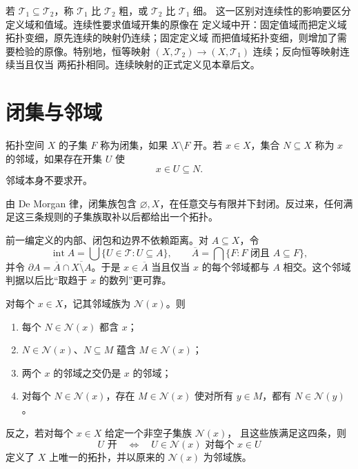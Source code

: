 若 \(\mathcal T_1\subseteq\mathcal T_2\)，称 \(\mathcal T_1\) 比 \(\mathcal T_2\) 粗，或 \(\mathcal T_2\) 比 \(\mathcal T_1\) 细。
这一区别对连续性的影响要区分定义域和值域。连续性要求值域开集的原像在
定义域中开：固定值域而把定义域拓扑变细，原先连续的映射仍连续；固定定义域
而把值域拓扑变细，则增加了需要检验的原像。特别地，恒等映射
\((X,\mathcal T_2)\to(X,\mathcal T_1)\) 连续；反向恒等映射连续当且仅当
两拓扑相同。连续映射的正式定义见本章后文。

\section{闭集与邻域}

\begin{definition}[闭集与邻域]
拓扑空间 \(X\) 的子集 \(F\) 称为闭集，如果 \(X\setminus F\) 开。若 \(x\in X\)，集合 \(N\subseteq X\) 称为 \(x\) 的邻域，如果存在开集 \(U\) 使
\[
 x\in U\subseteq N.
\]
邻域本身不要求开。
\end{definition}

由 De Morgan 律，闭集族包含 \(\varnothing,X\)，在任意交与有限并下封闭。反过来，任何满足这三条规则的子集族取补以后都给出一个拓扑。

前一编定义的内部、闭包和边界不依赖距离。对 \(A\subseteq X\)，令
\[
 \operatorname{int}A=\bigcup\{U\in\mathcal T:U\subseteq A\},
 \qquad
 \overline A=\bigcap\{F:F\text{ 闭且 }A\subseteq F\},
\]
并令 \(\partial A=\overline A\cap\overline{X\setminus A}\)。于是 \(x\in\overline A\) 当且仅当 \(x\) 的每个邻域都与 \(A\) 相交。这个邻域判据以后比“取趋于 \(x\) 的数列”更可靠。

\begin{proposition}[邻域系统刻画]
\label{prop:neighborhood-system-topology}
对每个 \(x\in X\)，记其邻域族为 \(\mathcal N(x)\)。则
\begin{enumerate}[label=\textup{(\roman*)}]
 \item 每个 \(N\in\mathcal N(x)\) 都含 \(x\)；
 \item \(N\in\mathcal N(x)\)、\(N\subseteq M\) 蕴含 \(M\in\mathcal N(x)\)；
 \item 两个 \(x\) 的邻域之交仍是 \(x\) 的邻域；
 \item 对每个 \(N\in\mathcal N(x)\)，存在 \(M\in\mathcal N(x)\) 使对所有 \(y\in M\)，都有 \(N\in\mathcal N(y)\)。
\end{enumerate}
反之，若对每个 \(x\in X\) 给定一个非空子集族 \(\mathcal N(x)\)，
且这些族满足这四条，则
\[
 U\text{ 开}\quad\Longleftrightarrow\quad
 U\in\mathcal N(x)\text{ 对每个 }x\in U
\]
定义了 \(X\) 上唯一的拓扑，并以原来的 \(\mathcal N(x)\) 为邻域族。
\end{proposition}


